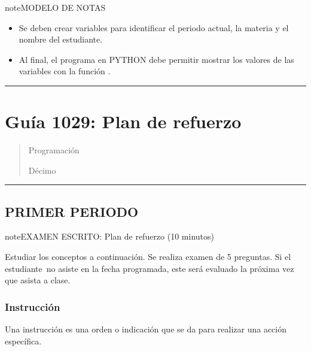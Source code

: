 \documentclass[letterpaper,10pt,spanish]{sphinxmanual}
\begin{document}
\begin{sphinxadmonition}{note}{MODELO DE NOTAS}
\begin{enumerate}
\begin{itemize}
\item {} 
\sphinxAtStartPar
Se deben crear variables para identificar el periodo actual, la materia y el nombre del estudiante.

\item {} 
\sphinxAtStartPar
Al final, el programa en PYTHON debe permitir mostrar los valores de las variables con la función .

\end{itemize}

\end{enumerate}
\end{sphinxadmonition}


\bigskip\hrule\bigskip


\sphinxstepscope


\section{Guía 1029: Plan de refuerzo}
\label{\detokenize{1_guias/10programacion/G1029:guia-1029-plan-de-refuerzo}}\label{\detokenize{1_guias/10programacion/G1029::doc}}\begin{quote}\begin{description}
\sphinxAtStartPar
Programación

\sphinxAtStartPar
Décimo

\end{description}\end{quote}


\bigskip\hrule\bigskip



\subsection{PRIMER PERIODO}
\label{\detokenize{1_guias/10programacion/G1029:primer-periodo}}
\begin{sphinxadmonition}{note}{EXAMEN ESCRITO: Plan de refuerzo (10 minutos)}

\sphinxAtStartPar
Estudiar los conceptos a continuación. Se realiza examen de 5 preguntas. Si el estudiante no asiste en la fecha programada, este será evaluado la próxima vez que asista a clase.
\end{sphinxadmonition}


\subsubsection{Instrucción}
\label{\detokenize{1_guias/10programacion/G1029:instruccion}}
\sphinxAtStartPar
Una instrucción es una orden o indicación que se da para realizar una acción específica.
\end{document}
